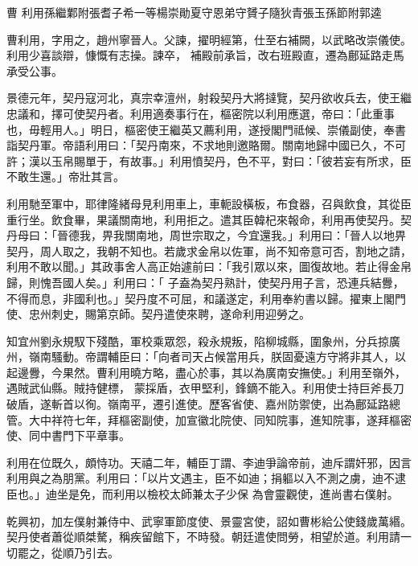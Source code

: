 
\begin{pinyinscope}

 曹
 利用孫繼鄴附張耆子希一等楊崇勛夏守恩弟守贇子隨狄青張玉孫節附郭逵



 曹利用，字用之，趙州寧晉人。父諫，擢明經第，仕至右補闕，以武略改崇儀使。利用少喜談辯，慷慨有志操。諫卒，
 補殿前承旨，改右班殿直，遷為鄜延路走馬承受公事。



 景德元年，契丹寇河北，真宗幸澶州，射殺契丹大將撻覽，契丹欲收兵去，使王繼忠議和，擇可使契丹者。利用適奏事行在，樞密院以利用應選，帝曰：「此重事也，毋輕用人。」明日，樞密使王繼英又薦利用，遂授閣門祗候、崇儀副使，奉書詣契丹軍。帝語利用曰：「契丹南來，不求地則邀賂爾。關南地歸中國已久，不可許；漢以玉帛賜單于，有故事。」利用憤契丹，色不平，對曰：「彼若妄有所求，臣
 不敢生還。」帝壯其言。



 利用馳至軍中，耶律隆緒母見利用車上，車軛設橫板，布食器，召與飲食，其從臣重行坐。飲食畢，果議關南地，利用拒之。遣其臣韓杞來報命，利用再使契丹。契丹母曰：「晉德我，畀我關南地，周世宗取之，今宜還我。」利用曰：「晉人以地畀契丹，周人取之，我朝不知也。若歲求金帛以佐軍，尚不知帝意可否，割地之請，利用不敢以聞。」其政事舍人高正始遽前曰：「我引眾以來，圖復故地。若止得金帛歸，則愧吾國人矣。」利用曰：「
 子盍為契丹熟計，使契丹用子言，恐連兵結釁，不得而息，非國利也。」契丹度不可屈，和議遂定，利用奉約書以歸。擢東上閣門使、忠州刺史，賜第京師。契丹遣使來聘，遂命利用迎勞之。



 知宜州劉永規馭下殘酷，軍校乘眾怨，殺永規叛，陷柳城縣，圍象州，分兵掠廣州，嶺南騷動。帝謂輔臣曰：「向者司天占候當用兵，朕固憂遠方守將非其人，以起邊釁，今果然。曹利用曉方略，盡心於事，其以為廣南安撫使。」利用至嶺外，遇賊武仙縣。賊持健標，
 蒙採盾，衣甲堅利，鋒鏑不能入。利用使士持巨斧長刀破盾，遂斬首以徇。嶺南平，遷引進使。歷客省使、嘉州防禦使，出為鄜延路總管。大中祥符七年，拜樞密副使，加宣徽北院使、同知院事，進知院事，遂拜樞密使、同中書門下平章事。



 利用在位既久，頗恃功。天禧二年，輔臣丁謂、李迪爭論帝前，迪斥謂奸邪，因言利用與之為朋黨。利用曰：「以片文遇主，臣不如迪；捐軀以入不測之虜，迪不逮臣也。」迪坐是免，而利用以檢校太師兼太子少保
 為會靈觀使，進尚書右僕射。



 乾興初，加左僕射兼侍中、武寧軍節度使、景靈宮使，詔如曹彬給公使錢歲萬緡。契丹使者蕭從順桀驁，稱疾留館下，不時發。朝廷遣使問勞，相望於道。利用請一切罷之，從順乃引去。




\end{pinyinscope}
